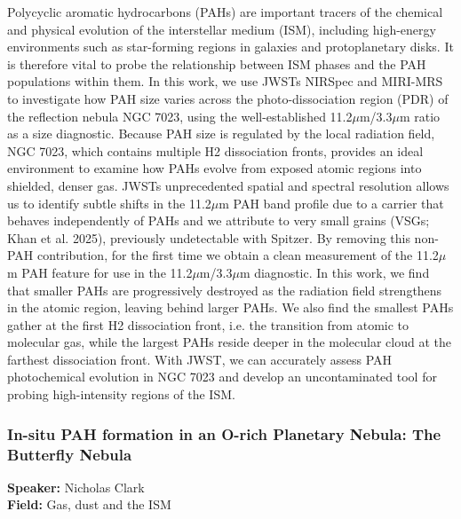 Polycyclic aromatic hydrocarbons (PAHs) are important tracers of the chemical and physical evolution of the interstellar medium (ISM), including high-energy environments such as star-forming regions in galaxies and protoplanetary disks. It is therefore vital to probe the relationship between ISM phases and the PAH populations within them. In this work, we use JWSTs NIRSpec and MIRI-MRS to investigate how PAH size varies across the photo-dissociation region (PDR) of the reflection nebula NGC 7023, using the well-established 11.2$\mu$m/3.3$\mu$m ratio as a size diagnostic. Because PAH size is regulated by the local radiation field, NGC 7023, which contains multiple H2 dissociation fronts, provides an ideal environment to examine how PAHs evolve from exposed atomic regions into shielded, denser gas. JWSTs unprecedented spatial and spectral resolution allows us to identify subtle shifts in the 11.2$\mu$m PAH band profile due to a carrier that behaves independently of PAHs and we attribute to very small grains (VSGs; Khan et al. 2025), previously undetectable with Spitzer. By removing this non-PAH contribution, for the first time we obtain a clean measurement of the 11.2$\mu$m PAH feature for use in the 11.2$\mu$m/3.3$\mu$m diagnostic. In this work, we find that smaller PAHs are progressively destroyed as the radiation field strengthens in the atomic region, leaving behind larger PAHs. We also find the smallest PAHs gather at the first H2 dissociation front, i.e. the transition from atomic to molecular gas, while the largest PAHs reside deeper in the molecular cloud at the farthest dissociation front. With JWST, we can accurately assess PAH photochemical evolution in NGC 7023 and develop an uncontaminated tool for probing high-intensity regions of the ISM.

\hypertarget{abstract-talk-113}{}\label{abstract-page-talk-113}
\subsubsection*{In-situ PAH formation in an O-rich Planetary Nebula: The Butterfly Nebula}
\textbf{Speaker:} Nicholas Clark\\
\textbf{Field:} Gas, dust and the ISM

